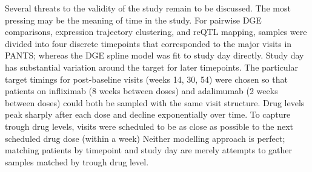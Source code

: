 Several threats to the validity of the study remain to be discussed.
The most pressing may be the meaning of time in the study.
For pairwise \gls{DGE} comparisons, expression trajectory clustering, and \gls{reQTL} mapping, 
samples were divided into four discrete timepoints that corresponded to the major visits in \gls{PANTS};
whereas the \gls{DGE} spline model was fit to study day directly.
Study day has substantial variation around the target for later timepoints.
The particular target timings for post-baseline visits (weeks 14, 30, 54) were chosen so that patients on infliximab (8 weeks between doses) and adalimumab (2 weeks between doses) could both be sampled with the same visit structure.
Drug levels peak sharply after each dose and decline exponentially over time.
To capture trough drug levels, visits were scheduled to be as close as possible to the next scheduled drug dose (within a week)
Neither modelling approach is perfect; matching patients by timepoint and study day are merely attempts to gather samples matched by trough drug level.

